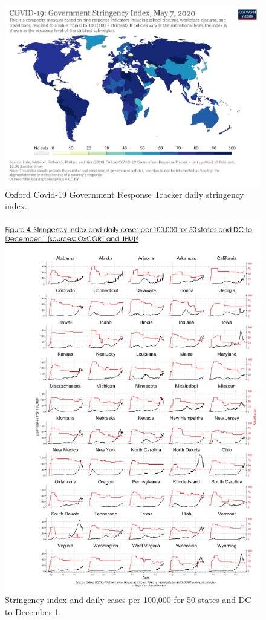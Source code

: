 \documentclass[final,3p,times,authoryear]{elsarticle}
\begin{document}
\begin{figure}
\centering
\includegraphics[width=.99\linewidth]{images/covid-stringency-index.png}
\caption{Oxford Covid-19 Government Response Tracker daily stringency index.}
 \label{fig:oxcgrt}
\end{figure} 

\begin{figure}
\centering
\includegraphics[width=.99\linewidth]{images/Hallas2020-stateStr.png}
\caption{Stringency index and daily cases per 100,000 for 50 states and DC to December 1\citep{Hallas2020}.}
 \label{fig:statestr}
\end{figure}
\end{document}
